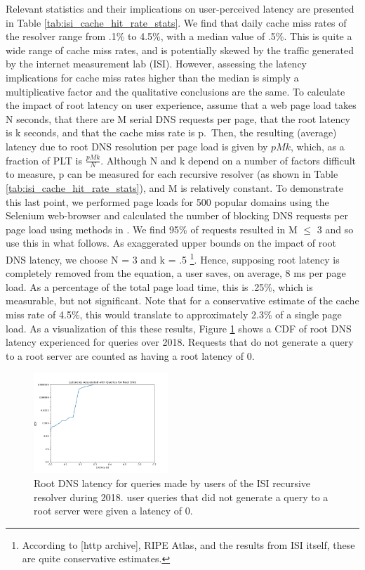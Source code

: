 \documentclass[sigconf,nonacm,10pt]{acmart}
\begin{document}
Relevant statistics and their implications on user-perceived latency are
presented in Table \ref{tab:isi_cache_hit_rate_stats}. We find that
daily cache miss rates of the resolver range from .1\% to 4.5\%, with a
median value of .5\%. This is quite a wide range of cache miss rates,
and is potentially skewed by the traffic generated by the internet
measurement lab (ISI). However, assessing the latency implications for
cache miss rates higher than the median is simply a multiplicative
factor and the qualitative conclusions are the same. \break \break
To calculate the impact of root latency on user experience, assume that
a web page load takes N seconds, that there are M serial DNS requests
per page, that the root latency is k seconds, and that the cache miss
rate is p.~Then, the resulting (average) latency due to root DNS
resolution per page load is given by \(pMk\), which, as a fraction of
PLT is \(\frac{p M k}{N}\). \break \break
Although N and k depend on a number of factors difficult to measure, p
can be measured for each recursive resolver (as shown in Table
\ref{tab:isi_cache_hit_rate_stats}), and M is relatively constant. To
demonstrate this last point, we performed page loads for 500 popular
domains using the Selenium web-browser and calculated the number of
blocking DNS requests per page load using methods in
\cite{sundaresan2013web}. We find 95\% of requests resulted in M
\(\leq\) 3 and so use this in what follows. \break
As exaggerated upper bounds on the impact of root DNS latency, we choose
N = 3 and k = .5
\footnote{ According to [http archive], RIPE Atlas, and the results from ISI itself, these are quite conservative estimates. }.
Hence, supposing root latency is completely removed from the equation, a
user saves, on average, 8 ms per page load. As a percentage of the total
page load time, this is .25\%, which is measurable, but not significant.
Note that for a conservative estimate of the cache miss rate of 4.5\%,
this would translate to approximately 2.3\% of a single page load.
\break \break
As a visualization of this these results, Figure
\ref{fig:isi_root_dns_latency} shows a CDF of root DNS latency
experienced for queries over 2018. Requests that do not generate a query
to a root server are counted as having a root latency of 0.

\begin{figure}
    \centering
    \includegraphics[width=0.45\textwidth]{figures/isi_root_dns_latency.png}
    \caption{Root DNS latency for queries made by users of the ISI recursive resolver during 2018. user queries that did not generate a query to a root server were given a latency of 0. }
    \label{fig:isi_root_dns_latency}
\end{figure}
\end{document}
